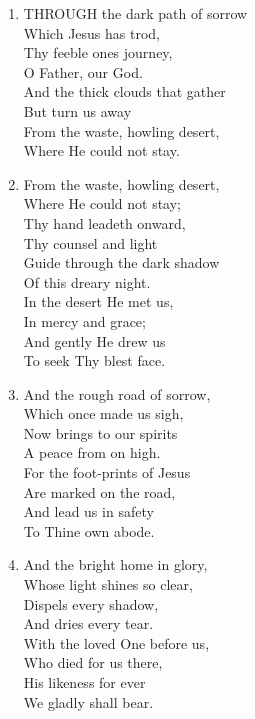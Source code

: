 \documentclass[11pt,a4paper]{article}
\begin{document}
\begin{enumerate}
    \item THROUGH the dark path of sorrow \\
        Which Jesus has trod, \\
        Thy feeble ones journey, \\
        O Father, our God. \\
        And the thick clouds that gather \\
        But turn us away \\
        From the waste, howling desert, \\
        Where He could not stay.

    \item From the waste, howling desert, \\
        Where He could not stay; \\
        Thy hand leadeth onward, \\
        Thy counsel and light \\
        Guide through the dark shadow \\
        Of this dreary night. \\
        In the desert He met us, \\
        In mercy and grace; \\
        And gently He drew us \\
        To seek Thy blest face.

    \item And the rough road of sorrow, \\
        Which once made us sigh, \\
        Now brings to our spirits \\
        A peace from on high. \\
        For the foot-prints of Jesus \\
        Are marked on the road, \\
        And lead us in safety \\
        To Thine own abode.

    \item And the bright home in glory, \\
        Whose light shines so clear, \\
        Dispels every shadow, \\
        And dries every tear. \\
        With the loved One before us, \\
        Who died for us there, \\
        His likeness for ever \\
        We gladly shall bear.


\end{enumerate}
\end{document}

